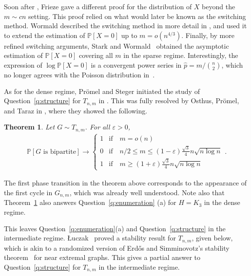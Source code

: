 \documentclass[11pt]{article}
\newcommand{\eps}{\varepsilon}
\def\P{\mathbb P}
\theoremstyle{plain}
\newtheorem{thm}{Theorem}[section]
\begin{document}
Soon after \cite{janson1988exponential}, Frieze  \cite{Frieze1992SmallSubgraphs} gave a different proof for the distribution of $X$ beyond the $m \sim cn$ setting. This proof relied on what would later be known as the switching method. Wormald described the switching method in more detail in \cite{wormald1996}, and used it to extend the estimation of $\P[X = 0]$ up to $m=o(n^{4/3})$. Finally,  by more refined switching arguments, Stark and Wormald~\cite{STARK_WORMALD_2018} obtained the asymptotic estimation of $\P[X = 0]$ covering all $m$ in  the sparse regime.
Interestingly, the expression of $\log \P[X = 0]$ is a convergent power series in $\hat p=m/\binom{n}{2}$, which no longer agrees with the Poisson distribution in~\cite{PROMEL1996311}.  



As for the dense regime, Pr\"omel and Steger initiated the study of Question~\ref{q:structure} for $T_{n,m}$ in \cite{promel1996asymptotic}. This was fully resolved by Osthus, Pr\"omel, and Taraz in \cite{osthus2003densities}, where they showed the following. 


\begin{thm}\label{thm: osthus 0-1}\cite{osthus2003densities}
            Let $G \sim T_{n,m}$. For all $\eps > 0$,
            \begin{align*}
                \P[G \text{ is bipartite}] \rightarrow \begin{cases}
                    1 &\text{if}\quad m = o(n)\\
                    0 &\text{if}\quad n/2 \leq m \leq (1 - \eps)\frac{\sqrt 3}{4}n\sqrt{n\log n}\\
                    1 &\text{if}\quad m \geq (1 + \eps)\frac{\sqrt 3}{4}n\sqrt{n\log n}
                \end{cases}
                .
            \end{align*}
        \end{thm}
The first phase transition in the theorem above corresponds to the appearance of the first cycle in $G_{n,m}$, which was already well understood. Note also that Theorem~\ref{thm: osthus 0-1} also answers Question~\ref{q:enumeration} (a) for $H=K_3$ in the dense regime.





This leaves Question~\ref{q:enumeration}(a) and Question~\ref{q:structure}
in the intermediate regime. {\L}uczak~\cite{luczak2000triangle} proved a stability result for $T_{n,m}$, given below, which is akin to a randomized version of Erd\H{o}s and Simminovotz's stability theorem~\cite{ErdosSimonovits1966} for near extremal graphs.
This gives a partial answer to Question~\ref{q:structure} for $T_{n,m}$ in the intermediate regime.
\end{document}
